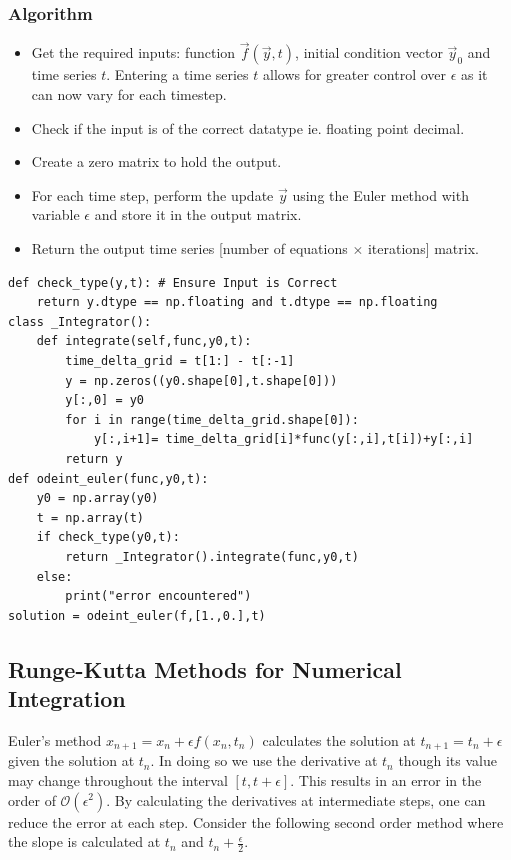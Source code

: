 \documentclass[10pt,letterpaper]{article}
\begin{document}
\subsubsection*{Algorithm}

\begin{itemize}
\item Get the required inputs: function $\vec{f}(\vec{y},t)$, initial condition vector $\vec{y}_0$ and time series $t$. Entering a time series $t$ allows for greater control over $\epsilon$ as it can now vary for each timestep. 
\item Check if the input is of the correct datatype ie. floating point decimal.
\item Create a zero matrix to hold the output.
\item For each time step, perform the update $\vec{y}$ using the Euler method with variable $\epsilon$ and store it in the output matrix.
\item Return the output time series [number of equations $\times$ iterations] matrix.
\end{itemize}

\begin{verbatim}
def check_type(y,t): # Ensure Input is Correct
    return y.dtype == np.floating and t.dtype == np.floating
class _Integrator():
    def integrate(self,func,y0,t):
        time_delta_grid = t[1:] - t[:-1]
        y = np.zeros((y0.shape[0],t.shape[0]))
        y[:,0] = y0
        for i in range(time_delta_grid.shape[0]):
            y[:,i+1]= time_delta_grid[i]*func(y[:,i],t[i])+y[:,i]
        return y
def odeint_euler(func,y0,t):
    y0 = np.array(y0)
    t = np.array(t)
    if check_type(y0,t):
        return _Integrator().integrate(func,y0,t)
    else:
        print("error encountered")
solution = odeint_euler(f,[1.,0.],t)
\end{verbatim}

\subsection*{Runge-Kutta Methods for Numerical Integration}

Euler's method $x_{n+1}=x_n + \epsilon f(x_n,t_n)$ calculates the solution at $t_{n+1}=t_n+\epsilon$ given the solution at $t_n$. In doing so we use the derivative at $t_{n}$ though its value may change throughout the interval $[t,t+\epsilon]$.  This results in an error in the order of $\mathcal{O}(\epsilon^2)$. By calculating the derivatives at intermediate steps, one can reduce the error at each step. Consider the following second order method where the slope is calculated at $t_{n}$ and $t_n+\frac{\epsilon}{2}$.
\end{document}
